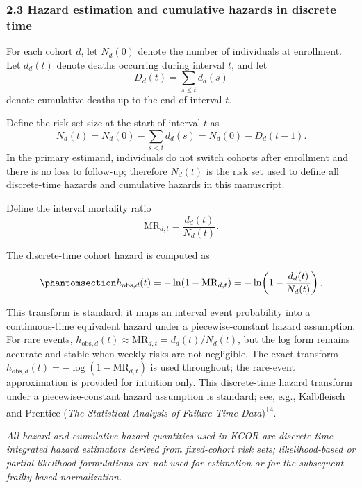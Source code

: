 \documentclass[
]{article}
\begin{document}
\subsubsection{2.3 Hazard estimation and cumulative hazards in discrete time}\label{hazard-estimation-and-cumulative-hazards-in-discrete-time}

For each cohort \(d\), let \(N_d(0)\) denote the number of individuals at enrollment. Let \(d_d(t)\) denote deaths occurring during interval \(t\), and let \[D_d(t) = \sum_{s \le t} d_d(s)\] denote cumulative deaths up to the end of interval \(t\).

Define the risk set size at the start of interval \(t\) as \[N_d(t) = N_d(0) - \sum_{s < t} d_d(s) = N_d(0) - D_d(t-1).\] In the primary estimand, individuals do not switch cohorts after enrollment and there is no loss to follow-up; therefore \(N_d(t)\) is the risk set used to define all discrete-time hazards and cumulative hazards in this manuscript.

Define the interval mortality ratio \[\mathrm{MR}_{d,t} = \frac{d_d(t)}{N_d(t)}.\]

The discrete-time cohort hazard is computed as

\begin{equation}\protect\phantomsection\label{eq:hazard-discrete}{h_{\mathrm{obs},d}(t) = -\ln\!\left(1 - \mathrm{MR}_{d,t}\right) = -\ln\!\left(1 - \frac{d_d(t)}{N_d(t)}\right).}\end{equation}

This transform is standard: it maps an interval event probability into a continuous-time equivalent hazard under a piecewise-constant hazard assumption. For rare events, \(h_{\mathrm{obs},d}(t) \approx \mathrm{MR}_{d,t} = d_d(t)/N_d(t)\), but the log form remains accurate and stable when weekly risks are not negligible. The exact transform \(h_{\mathrm{obs},d}(t) = -\log(1 - \mathrm{MR}_{d,t})\) is used throughout; the rare-event approximation is provided for intuition only. This discrete-time hazard transform under a piecewise-constant hazard assumption is standard; see, e.g., Kalbfleisch and Prentice (\emph{The Statistical Analysis of Failure Time Data})\textsuperscript{14}.

\emph{All hazard and cumulative-hazard quantities used in KCOR are discrete-time integrated hazard estimators derived from fixed-cohort risk sets; likelihood-based or partial-likelihood formulations are not used for estimation or for the subsequent frailty-based normalization.}
\end{document}
